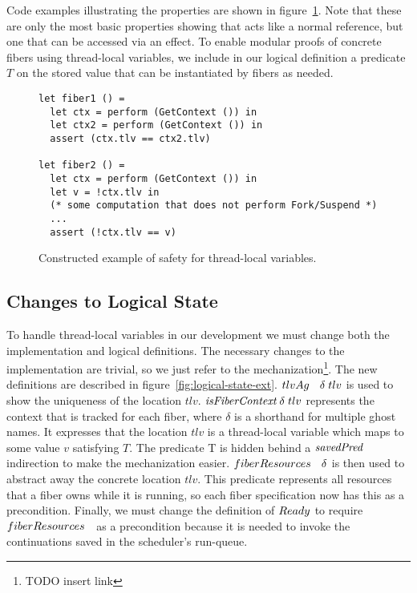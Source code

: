 Code examples illustrating the properties are shown in figure~\ref{fig:tlv-example}.
Note that these are only the most basic properties showing that  acts like a normal reference, but one that can be accessed via an effect.
To enable modular proofs of concrete fibers using thread-local variables, we include in our logical definition a predicate \(T\) on the stored value that can be instantiated by fibers as needed.

\begin{figure}[ht]
    \begin{verbatim}
let fiber1 () =
  let ctx = perform (GetContext ()) in
  let ctx2 = perform (GetContext ()) in
  assert (ctx.tlv == ctx2.tlv)

let fiber2 () =
  let ctx = perform (GetContext ()) in
  let v = !ctx.tlv in
  (* some computation that does not perform Fork/Suspend *)
  ...
  assert (!ctx.tlv == v)
  \end{verbatim}
    \caption{Constructed example of safety for thread-local variables.}
    \label{fig:tlv-example}
\end{figure}

\subsection{Changes to Logical State}

To handle thread-local variables in our development we must change both the implementation and logical definitions.
The necessary changes to the implementation are trivial, so we just refer to the mechanization\footnote{TODO insert link}.
The new definitions are described in figure~\ref{fig:logical-state-ext}.
\(tlvAg~~\; \delta\; tlv\) is used to show the uniqueness of the location \(tlv\).
\(\emph{isFiberContext}{}\; \delta\; tlv\) represents the context that is tracked for each fiber, where \(\delta\) is a shorthand for multiple ghost names.
It expresses that the location \(tlv\) is a thread-local variable which maps to some value \(v\) satisfying \(T\).
The predicate T is hidden behind a \(\emph{savedPred}{}\) indirection to make the mechanization easier.
\(fiberResources~~\; \delta\) is then used to abstract away the concrete location \(tlv\).
This predicate represents all resources that a fiber owns while it is running, so each fiber specification now has this as a precondition.
Finally, we must change the definition of \(Ready_{}\) to require \(fiberResources~~\) as a precondition because it is needed to invoke the continuations saved in the scheduler's run-queue.

